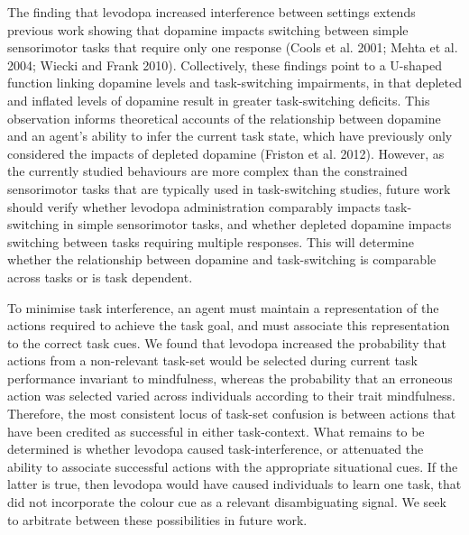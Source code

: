 \documentclass{article}
\begin{document}
The finding that levodopa increased interference between settings
extends previous work showing that dopamine impacts switching between
simple sensorimotor tasks that require only one response (Cools et al.
2001; Mehta et al. 2004; Wiecki and Frank 2010). Collectively, these
findings point to a U-shaped function linking dopamine levels and
task-switching impairments, in that depleted and inflated levels of
dopamine result in greater task-switching deficits. This observation
informs theoretical accounts of the relationship between dopamine and an
agent's ability to infer the current task state, which have previously
only considered the impacts of depleted dopamine (Friston et al. 2012).
However, as the currently studied behaviours are more complex than the
constrained sensorimotor tasks that are typically used in task-switching
studies, future work should verify whether levodopa administration
comparably impacts task-switching in simple sensorimotor tasks, and
whether depleted dopamine impacts switching between tasks requiring
multiple responses. This will determine whether the relationship between
dopamine and task-switching is comparable across tasks or is task
dependent.

To minimise task interference, an agent must maintain a representation
of the actions required to achieve the task goal, and must associate
this representation to the correct task cues. We found that levodopa
increased the probability that actions from a non-relevant task-set
would be selected during current task performance invariant to
mindfulness, whereas the probability that an erroneous action was
selected varied across individuals according to their trait mindfulness.
Therefore, the most consistent locus of task-set confusion is between
actions that have been credited as successful in either task-context.
What remains to be determined is whether levodopa caused
task-interference, or attenuated the ability to associate successful
actions with the appropriate situational cues. If the latter is true,
then levodopa would have caused individuals to learn one task, that did
not incorporate the colour cue as a relevant disambiguating signal. We
seek to arbitrate between these possibilities in future work.
\end{document}

